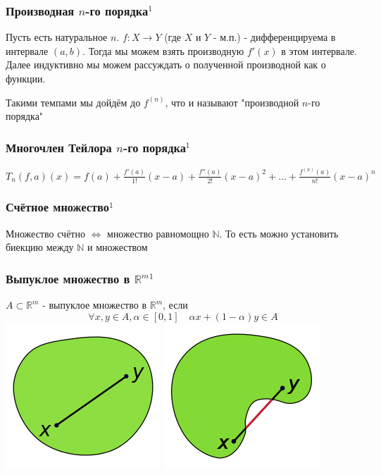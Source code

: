\documentclass{article}
\begin{document}
\subsubsection{Производная \texorpdfstring{$n$}{n}-го порядка\texorpdfstring{$^1$}{}}
Пусть есть натуральное $n$. $f: X \rightarrow Y$ (где $X$ и $Y$ - м.п.) - дифференцируема в интервале $(a, b)$. Тогда мы можем взять производную $f'(x)$ в этом интервале. Далее индуктивно мы можем рассуждать о полученной производной как о функции. 

Такими темпами мы дойдём до $f^(n)$, что и называют "производной $n$-го порядка"


\subsubsection{Многочлен Тейлора \texorpdfstring{$n$}{n}-го порядка\texorpdfstring{$^1$}{}}
$T_n(f, a)(x) = f(a) + \frac{f'(a)}{1!}(x-a)  + \frac{f''(a)}{2!}(x-a)^2 + \ldots+ \frac{f^{(n)}(a)}{n!}(x-a)^n$


\subsubsection{Счётное множество\texorpdfstring{$^1$}{}}
Множество счётно $\Leftrightarrow$ множество равномощно $\mathbb{N}$. 
То есть можно установить биекцию между $\mathbb{N}$ и множеством


\subsubsection{Выпуклое множество в \texorpdfstring{$\mathbb{R}^m$}{m-мерном R}\texorpdfstring{$^1$}{}}
$A \subset \mathbb{R}^m$ - выпуклое множество в $\mathbb{R}^m$, если 
$$
\forall x, y \in A, \alpha \in [0, 1] \quad \alpha x + (1 - \alpha) y \in A
$$
\includegraphics[scale=0.9]{convex}
\includegraphics[scale=0.9]{non-convex}
\end{document}
